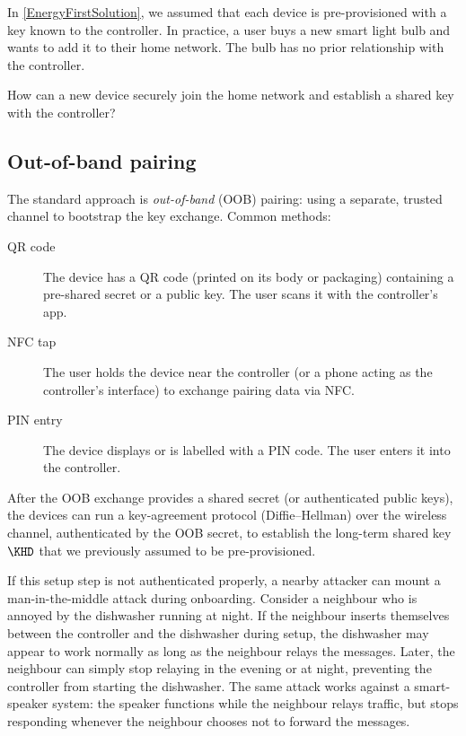 
In \cref{EnergyFirstSolution}, we assumed that each device is pre-provisioned
with a key known to the controller.
In practice, a user buys a new smart light bulb and wants to add it to their
home network.
The bulb has no prior relationship with the controller.

\begin{exercise}
  How can a new device securely join the home network and establish a shared
  key with the controller?
\end{exercise}

\subsection{Out-of-band pairing}

The standard approach is \emph{out-of-band} (OOB) pairing: using a separate,
trusted channel to bootstrap the key exchange.
Common methods:
\begin{description}
  \item[QR code] The device has a QR code (printed on its body or packaging)
    containing a pre-shared secret or a public key.
    The user scans it with the controller's app.
  \item[NFC tap] The user holds the device near the controller (or a phone
    acting as the controller's interface) to exchange pairing data via
    \ac{NFC}.
  \item[PIN entry] The device displays or is labelled with a PIN code.
    The user enters it into the controller.
\end{description}

After the OOB exchange provides a shared secret (or authenticated public
keys), the devices can run a key-agreement protocol (\eg Diffie--Hellman)
over the wireless channel, authenticated by the OOB secret, to establish
the long-term shared key~\(\KHD\) that we previously assumed to be
pre-provisioned.

If this setup step is not authenticated properly, a nearby attacker can mount
a man-in-the-middle attack during onboarding.
Consider a neighbour who is annoyed by the dishwasher running at night.
If the neighbour inserts themselves between the controller and the dishwasher
during setup, the dishwasher may appear to work normally as long as the
neighbour relays the messages.
Later, the neighbour can simply stop relaying in the evening or at night,
preventing the controller from starting the dishwasher.
The same attack works against a smart-speaker system: the speaker functions
while the neighbour relays traffic, but stops responding whenever the
neighbour chooses not to forward the messages.

